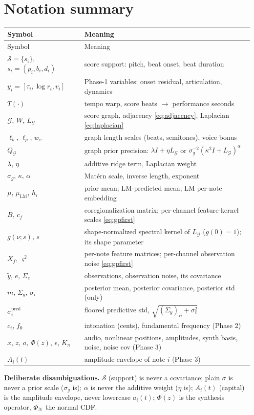 \documentclass[11pt,a4paper]{report}
\newcommand{\N}{\mathcal{N}}
\newcommand{\score}{\mathcal{S}}
\newcommand{\graph}{\mathcal{G}}
\newcommand{\Qg}{Q_{\graph}}
\newcommand{\Lg}{L_{\graph}}
\newcommand{\muLM}{\mu_{\mathrm{LM}}}  %
\newcommand{\Sy}{\Sigma_y}             %
\begin{document}
\chapter{Notation summary}\label{app:notation}
\begin{center}
\begin{longtable}{@{}p{4.3cm}p{9.2cm}@{}}
\toprule
Symbol & Meaning \\
\midrule
\endfirsthead
\toprule
Symbol & Meaning \\
\midrule
\endhead
\bottomrule
\endfoot
$\score = \{s_i\}$, $s_i = (p_i, b_i, d_i)$ & score support: pitch, beat onset, beat duration \\
$y_i = [\tau_i, \log r_i, v_i]$ & Phase-1 variables: onset residual, articulation, dynamics \\
$T(\cdot)$ & tempo warp, score beats $\to$ performance seconds \\
$\graph$, $W$, $\Lg$ & score graph, adjacency \eqref{eq:adjacency}, Laplacian \eqref{eq:laplacian} \\
$\ell_b$, $\ell_p$, $w_v$ & graph length scales (beats, semitones), voice bonus \\
$\Qg$ & graph prior precision: $\lambda I + \eta \Lg$ or $\sigma_g^{-2}(\kappa^2 I + \Lg)^\alpha$ \\
$\lambda$, $\eta$ & additive ridge term, Laplacian weight \\
$\sigma_g$, $\kappa$, $\alpha$ & Mat\'ern scale, inverse length, exponent \\
$\mu$, $\muLM$, $h_i$ & prior mean; LM-predicted mean; LM per-note embedding \\
$B$, $c_f$ & coregionalization matrix; per-channel feature-kernel scales \eqref{eq:gpfirst} \\
$g(\nu; s)$, $s$ & shape-normalized spectral kernel of $\Lg$ ($g(0){=}1$); its shape parameter \\
$X_f$, $\varsigma^2$ & per-note feature matrices; per-channel observation noise \eqref{eq:gpfirst} \\
$\tilde y$, $e$, $\Sigma_e$ & observations, observation noise, its covariance \\
$m$, $\Sy$, $\sigma_i$ & posterior mean, posterior covariance, posterior std (only) \\
$\sigma_i^{\mathrm{pred}}$ & floored predictive std, $\sqrt{(\Sy)_{ii} + \sigma_e^2}$ \\
$c_i$, $f_0$ & intonation (cents), fundamental frequency (Phase 2) \\
$x$, $z$, $a$, $\Phi(z)$, $\epsilon$, $K_n$ & audio, nonlinear positions, amplitudes, synth basis, noise, noise cov (Phase 3) \\
$A_i(t)$ & amplitude envelope of note $i$ (Phase 3) \\
\end{longtable}
\end{center}
\noindent\textbf{Deliberate disambiguations.} $\score$ (support) is never a
covariance; plain $\sigma$ is never a prior scale ($\sigma_g$ is); $\alpha$ is never
the additive weight ($\eta$ is); $A_i(t)$ (capital) is the amplitude envelope, never
lowercase $a_i(t)$; $\Phi(z)$ is the synthesis operator, $\Phi_{\N}$ the normal CDF.
\end{document}
